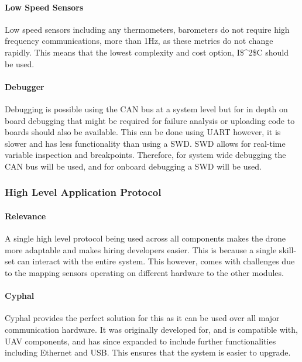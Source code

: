 \paragraph{Low Speed Sensors}
Low speed sensors including any thermometers, barometers do not require high frequency 
communications, more than 1Hz, as these metrics do not change rapidly. This means that the lowest complexity and cost option, \gls{I$^2$C} should be used.

\paragraph{Debugger}
Debugging is possible using the \gls{CAN} bus at a system level but for in depth on board debugging that might be required for failure analysis or uploading code to boards should also be available. This can be done using \gls{UART} however, it is slower and has less functionality than using a \gls{SWD}. \gls{SWD} allows for real-time variable inspection and breakpoints. Therefore, for system wide debugging the \gls{CAN} bus will be used, and for onboard debugging a \gls{SWD} will be used.

\subsubsection{High Level Application Protocol}

\paragraph{Relevance}
A single high level protocol being used across all components makes the drone more adaptable and makes hiring developers easier. This is because a single skill-set can interact with the entire system. This however, comes with challenges due to the mapping sensors operating on different hardware to the other modules.

\paragraph{Cyphal}
Cyphal provides the perfect solution for this as it can be used over all major communication hardware. It was originally developed for, and is compatible with, \gls{UAV} components, and has since expanded to include further functionalities including Ethernet and \gls{USB}. This ensures that the system is easier to upgrade.
